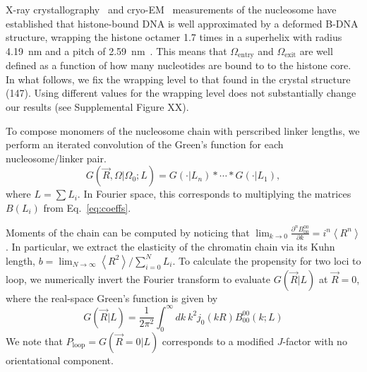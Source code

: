 \documentclass[%
 reprint,
superscriptaddress,
showpacs,preprintnumbers,
 amsmath,amssymb,
 aps,
 prl,
]{revtex4-1}
\newcommand{\greens}[2][\Omega_0; L]{G(#2|#1)}
\newcommand{\RR}{\left\langle{}R^2\right\rangle{}}
\begin{document}
X-ray crystallography~\cite{white2001,richmond2003,cutter2015a} and
    cryo-EM~\cite{bednar2017,bilokapic2018,eltsov2018,wakamori2015,zhou2015}
    measurements of the nucleosome have established that histone-bound DNA is
    well approximated by a deformed B-DNA structure, wrapping the histone
    octamer 1.7 times in a superhelix with radius \SI{4.19}{\nano\metre} and a
    pitch of \SI{2.59}{\nano\metre}~\cite{richmond2003}.
This means that $\Omega_\text{entry}$ and $\Omega_\text{exit}$ are well defined as a
    function of how many nucleotides are bound to to the histone core.
In what follows, we fix the wrapping level to that found in the crystal
    structure (\SI{147}{\basepair}).
Using different values for the wrapping level does not substantially change our
    results (see Supplemental Figure XX).

To compose monomers of the nucleosome chain with perscribed linker lengths, we
    perform an iterated convolution of the Green's function for each
    nucleosome/linker pair.
\begin{equation}\label{eq:conv}
    \greens{\vec{R},\Omega} = \greens[L_n]{\cdot} * \cdots{} * \greens[L_1]{\cdot},
\end{equation}
    where $L = \sum L_i$.
In Fourier space, this corresponds to multiplying the matrices $B(L_i)$
    from Eq.~\ref{eq:coeffs}.

Moments of the chain can be computed by noticing that
    $\lim_{k\to0} \frac{\partial^n B_{00}^{00}}{\partial k} = i^n \left\langle
    R^n\right\rangle$.
In particular, we extract the elasticity of the chromatin chain via its Kuhn
    length, $b = \lim_{N\to\infty} \RR/\sum_{i=0}^N L_i$.
To calculate the propensity for two loci to loop, we numerically invert
    the Fourier transform to evaluate $\greens[L]{\vec{R}}$ at $\vec{R} = 0$,
    where the real-space Green's function is given by
\begin{equation}\label{eq:realgreens}
    \greens[L]{\vec{R}} = \frac{1}{2\pi^2}\int_0^\infty dk~k^2 j_0(kR) B_{00}^{00}(k;L)
\end{equation}
We note that $P_\text{loop}=\greens[L]{\vec{R}=0}$ corresponds to a modified $J$-factor with no orientational component.
\end{document}
